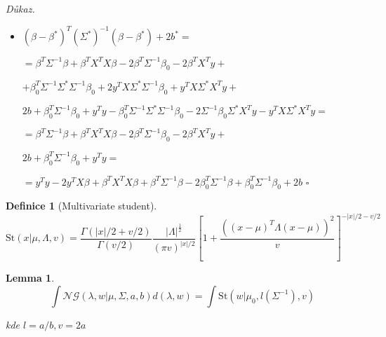\documentclass{article}
\newenvironment{pitemize}{
\begin{itemize}
  \setlength{\itemsep}{5pt}
  \setlength{\parskip}{0pt}
  \setlength{\parsep}{0pt}
}{\end{itemize}}
\newenvironment{pproof}{
\noindent\emph{Důkaz.}
\begin{pitemize}
}{\hfill$\square$\end{pitemize}}
\newcommand{\NoG}{\mathcal{NG}}
\newcommand{\St}{\mathrm{St}}
\newtheorem{lemma}{Lemma}
\theoremstyle{definition}
\newtheorem{definice}{Definice}
\begin{document}
\begin{pproof}
$
(\Sigma^{-1}\beta_0+X^Ty)^T
(\Sigma^{-1}+X^TX)^{-1}
(\Sigma^{-1}\beta_0+X^Ty)
=$

$=2b+\beta_0^T\Sigma^{-1}\beta_0+y^Ty
-($
\nopagebreak

$
\beta_0^T\Sigma^{-1}
(\Sigma^{-1}+X^TX)^{-1}
\Sigma^{-1}\beta_0+
$
\nopagebreak

$+
2\Sigma^{-1}\beta_0
(\Sigma^{-1}+X^TX)^{-1}
X^Ty
+
y^TX
(\Sigma^{-1}+X^TX)^{-1}
X^Ty)
=$


$=2b+\beta_0^T\Sigma^{-1}\beta_0+y^Ty
-
\beta_0^T\Sigma^{-1}
\Sigma^*
\Sigma^{-1}\beta_0-
2\Sigma^{-1}\beta_0
\Sigma^*
X^Ty
-
y^TX
\Sigma^*
X^Ty
$

\item $(\beta-\beta^*)^T(\Sigma^*)^{-1}(\beta-\beta^*)+2b^*=$

$=\beta^T\Sigma^{-1}\beta
+\beta^TX^TX\beta
-2\beta^T\Sigma^{-1}\beta_0
-2\beta^TX^Ty
+ $
\nopagebreak

$+
\beta_0^T{\Sigma^{-1}}
{\Sigma^*}
\Sigma^{-1}\beta_0
+2
y^TX
{\Sigma^*}
\Sigma^{-1}\beta_0
+y^TX
{\Sigma^*}
X^Ty+
$
\nopagebreak

$2b+\beta_0^T\Sigma^{-1}\beta_0+y^Ty
-
\beta_0^T\Sigma^{-1}
\Sigma^*
\Sigma^{-1}\beta_0-
2\Sigma^{-1}\beta_0
\Sigma^*
X^Ty
-
y^TX
\Sigma^*
X^Ty=
$

$=\beta^T\Sigma^{-1}\beta
+\beta^TX^TX\beta
-2\beta^T\Sigma^{-1}\beta_0
-2\beta^TX^Ty
+ $
\nopagebreak


$2b+\beta_0^T\Sigma^{-1}\beta_0+y^Ty=
$

$=y^Ty-2y^TX\beta+\beta^TX^TX\beta
+\beta^T\Sigma^{-1}\beta-2\beta_0^T\Sigma^{-1}\beta
+\beta_0^T\Sigma^{-1}\beta_0+2b$ 
\end{pproof}

\begin{definice}[Multivariate student]
$$\St(x|\mu,\Lambda,v)=\frac{\Gamma(|x|/2+v/2)}{\Gamma(v/2)}\frac{|\Lambda|^{\frac{1}{2}}}{(\pi v)^{|x|/2}}
\left[1+
\frac{((x-\mu)^T\Lambda(x-\mu))^2}{v}\right]^{-|x|/2-v/2}$$
\end{definice}

\begin{lemma}
\label{nedodelany_integral}
$$\int\NoG\left(\lambda,w|\mu,\Sigma,a,b\right) d (\lambda,w)=\int \St\left(w|\mu_0,l\left(\Sigma^{-1}\right),v\right)$$

kde $l=a/b,v=2a$

\end{lemma}
\end{document}
